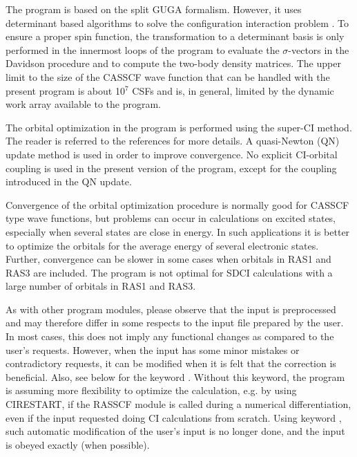 The  program is based on the split GUGA formalism.
However, it uses determinant based algorithms to solve the configuration
interaction problem \cite{rasdet}. To ensure a proper spin function,
the transformation to a determinant basis is only performed in the
innermost loops of the program to evaluate the $\sigma${-}vectors in the
Davidson procedure and to compute the two{-}body density matrices.
The upper limit to the size of the CASSCF wave function that can be
handled with the present program is about 10$^7$ CSFs and is,
in general, limited by the dynamic work array available to the
program.

The orbital optimization in the  program is performed
using the super-{}CI method. The reader is referred to the
references \cite{raspek,caspek3} for more details.
A quasi-{}Newton (QN) update method is used in order to improve
convergence. No explicit CI-{}orbital coupling is used in the present
version of the program, except for the coupling introduced in the QN
update.

Convergence of the orbital optimization procedure is normally good for
CASSCF type wave functions, but problems can occur in calculations on
excited states, especially when several states are close in energy.
In such applications it is better to optimize the orbitals for the
average energy of several electronic states.
Further, convergence can be slower in some cases when orbitals in RAS1
and RAS3 are included. The program is not optimal for SDCI
calculations with a large number of orbitals in RAS1 and RAS3.

As with other program modules, please observe that the input is preprocessed
and may therefore differ in some respects to the input file prepared by the
user. In most cases, this does not imply any functional changes as
compared to the user's requests. However, when the input
has some minor mistakes or contradictory requests, it can be modified
when it is felt that the correction is beneficial. Also, see below for
the keyword . Without this keyword, the program is
assuming more flexibility to optimize the calculation, e.g. by using
CIRESTART, if the RASSCF module is called during a numerical differentiation,
even if the input requested doing CI calculations from scratch.
Using keyword , such automatic modification of the
user's input is no longer done, and the input is obeyed exactly (when
possible).


